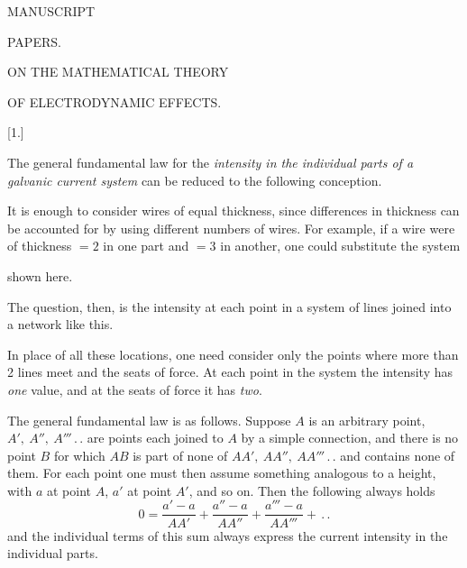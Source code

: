 \clearpage
{}
\thispagestyle{empty}
\vspace*{35mm}
\begin{center}
{\large MANUSCRIPT}\par\vspace{20mm}
{\LARGE PAPERS.}
\end{center}
\clearpage
{}
\begin{center}
{\large ON THE MATHEMATICAL THEORY}\par\vspace{3mm}
{\large OF ELECTRODYNAMIC EFFECTS.}
\end{center}
\begin{center}[1.]\end{center}
The general fundamental law for the \textit{intensity in the individual parts of a galvanic current system} can be reduced to the following conception.

It is enough to consider wires of equal thickness, since differences in thickness can be accounted for by using different numbers of wires. For example, if a wire were of thickness $=2$ in one part and $=3$ in another, one could substitute the system
\begin{center}\resizebox{.62\linewidth}{!}{}\end{center}
shown here.

The question, then, is the intensity at each point in a system of lines joined into a network like this.
\begin{center}\resizebox{.63\linewidth}{!}{}\end{center}
In place of all these locations, one need consider only the points where more than 2 lines meet and the seats of force. At each point in the system the intensity has \textit{one} value, and at the seats of force it has \textit{two}.

The general fundamental law is as follows. Suppose $A$ is an arbitrary point, $A',\ A'',\ A'''\,.\,.$ are points each joined to $A$ by a simple connection, and there is no point $B$ for which $AB$ is part of none of $AA',\ AA'',\ AA'''\,.\,.$ and contains none of them. For each point one must then assume something analogous to a height, with $a$ at point $A$, $a'$ at point $A'$, and so on. Then the following always holds
\[
0=\frac{a'-a}{AA'}+\frac{a''-a}{AA''}+\frac{a'''-a}{AA'''}+\,.\,.
\]
and the individual terms of this sum always express the current intensity in the individual parts.

